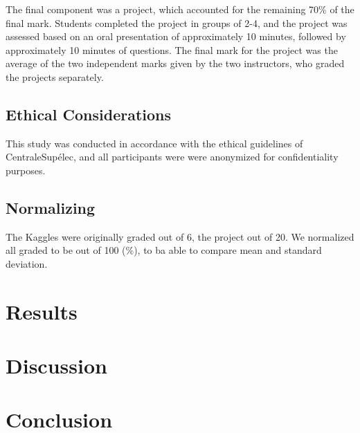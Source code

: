 \documentclass[a4paper]{article}
\begin{document}
The final component was a project, which accounted for the remaining 70\% of the final mark.
Students completed the project in groups of 2-4, and the project was assessed based on an oral presentation of approximately 10 minutes, followed by approximately 10 minutes of questions.
The final mark for the project was the average of the two independent marks given by the two instructors, who graded the projects separately.

\subsection{Ethical Considerations}
This study was conducted in accordance with the ethical guidelines of CentraleSupélec, and all participants were were anonymized for confidentiality purposes.

\subsection{Normalizing}
The Kaggles were originally graded out of 6, the project out of 20.
We normalized all graded to be out of 100 (\%), to ba able to compare mean and standard deviation.

\section{Results}
\section{Discussion}
\section{Conclusion}
\end{document}
